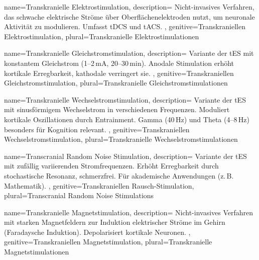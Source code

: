 

{
	name=Transkranielle Elektrostimulation,
	description={
			Nicht-invasives Verfahren, das schwache elektrische Ströme über Oberflächenelektroden nutzt, um neuronale Aktivität zu modulieren. Umfasst \gls{tDCS} und \gls{tACS}. \cite{woods_technical_2016}
		},
	genitive=Transkraniellen Elektrostimulation,
	plural=Transkranielle Elektrostimulationen
}


{
	name=Transkranielle Gleichstromstimulation,
	description={
			Variante der \gls{tES} mit konstantem Gleichstrom (1--2\,mA, 20--30\,min). Anodale Stimulation erhöht kortikale Erregbarkeit, kathodale verringert sie. \cite{woods_technical_2016, thair_transcranial_2017}
		},
	genitive=Transkraniellen Gleichstromstimulation,
	plural=Transkranielle Gleichstromstimulationen
}


{
	name=Transkranielle Wechselstromstimulation,
	description={
			Variante der \gls{tES} mit sinusförmigem Wechselstrom in verschiedenen Frequenzen. Moduliert kortikale Oszillationen durch Entrainment. Gamma (40\,Hz) und Theta (4--8\,Hz) besonders für Kognition relevant. \cite{akkad_increasing_2021}
		},
	genitive=Transkraniellen Wechselstromstimulation,
	plural=Transkranielle Wechselstromstimulationen
}


{
	name=Transcranial Random Noise Stimulation,
	description={
			Variante der \gls{tES} mit zufällig variierenden Stromfrequenzen. Erhöht Erregbarkeit durch stochastische Resonanz, schmerzfrei. Für akademische Anwendungen (z.\,B. Mathematik).
		},
	genitive=Transkraniellen Rausch-Stimulation,
	plural=Transcranial Random Noise Stimulations
}


{
	name=Transkranielle Magnetstimulation,
	description={
			Nicht-invasives Verfahren mit starken Magnetfeldern zur Induktion elektrischer Ströme im Gehirn (Faradaysche Induktion). Depolarisiert kortikale Neuronen. \cite{doccheck_transkranielle_nodate-1}
		},
	genitive=Transkraniellen Magnetstimulation,
	plural=Transkranielle Magnetstimulationen
}

